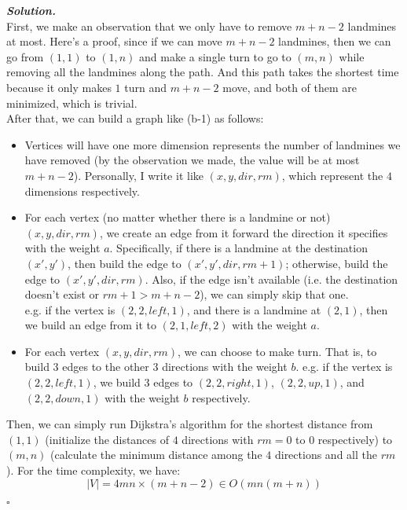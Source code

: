 \documentclass[12pt, a4paper, UTF8]{article}
\newenvironment{solution}[1][\it{Solution}]{\textbf{#1. }\\}{\begin{flushright}$\square$\end{flushright}}
\begin{document}
\begin{enumerate}
                \begin{solution}
                    First, we make an observation that we only have to remove $m + n - 2$ landmines at most. Here's a proof, since if we can move $m + n - 2$ landmines, then we can go from $(1, 1)$ to $(1, n)$ and make a single turn to go to $(m, n)$ while removing all the landmines along the path. And this path takes the shortest time because it only makes $1$ turn and $m + n - 2$ move, and both of them are minimized, which is trivial.\\
                    After that, we can build a graph like (b-1) as follows:
                    \begin{itemize}
                        \item Vertices will have one more dimension represents the number of landmines we have removed (by the observation we made, the value will be at most $m + n - 2$). Personally, I write it like $(x, y, dir, rm)$, which represent the $4$ dimensions respectively.
                        \item For each vertex (no matter whether there is a landmine or not) $(x, y, dir, rm)$, we create an edge from it forward the direction it specifies with the weight $a$. Specifically, if there is a landmine at the destination $(x', y')$, then build the edge to $(x', y', dir, rm + 1)$; otherwise, build the edge to $(x', y', dir, rm)$. Also, if the edge isn't available (i.e. the destination doesn't exist or $rm + 1 > m + n - 2$), we can simply skip that one.\\
                            e.g. if the vertex is $(2, 2, left, 1)$, and there is a landmine at $(2, 1)$, then we build an edge from it to $(2, 1, left, 2)$ with the weight $a$.
                        \item For each vertex $(x, y, dir, rm)$, we can choose to make turn. That is, to build $3$ edges to the other $3$ directions with the weight $b$.
                            e.g. if the vertex is $(2, 2, left, 1)$, we build $3$ edges to $(2, 2, right, 1)$, $(2, 2, up, 1)$, and $(2, 2, down, 1)$ with the weight $b$ respectively.
                    \end{itemize}
                    Then, we can simply run Dijkstra's algorithm for the shortest distance from $(1, 1)$ (initialize the distances of $4$ directions with $rm = 0$ to $0$ respectively) to $(m, n)$ (calculate the minimum distance among the $4$ directions and all the $rm$).
                    For the time complexity, we have: 
                $$|V| = 4mn \times (m + n - 2) \in O(mn(m + n))$$

\end{solution}
\end{enumerate}
\end{document}
